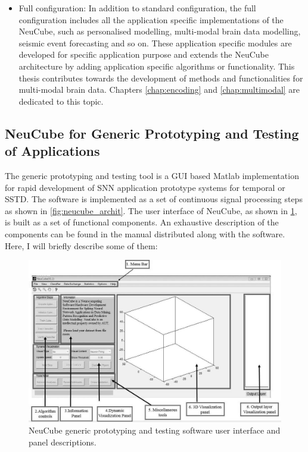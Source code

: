 \begin{itemize}
\begin{figure}
	\end{figure} 
	\item Full configuration: In addition to standard configuration, the full configuration includes all the application specific implementations of the NeuCube, such as personalised modelling, multi-modal brain data modelling, seismic event forecasting and so on. These application specific modules are developed for specific application purpose and extends the NeuCube architecture by adding application specific algorithms or functionality. This thesis contributes towards the development of methods and functionalities for multi-modal brain data. Chapters \ref{chap:encoding} and \ref{chap:multimodal} are dedicated to this topic.  
\end{itemize}

\subsection{NeuCube for Generic Prototyping and Testing of Applications}
The generic prototyping and testing tool is a GUI based Matlab implementation for rapid development of SNN application prototype systems for temporal or SSTD. The software is implemented as a set of continuous signal processing steps as shown in \figurename \ref{fig:neucube_archit}. The user interface of NeuCube, as shown in \figurename \ref{fig:neucube_ui}, is built as a set of functional components. An exhaustive description of the components can be found in the manual distributed along with the software. Here, I will briefly describe some of them:
\begin{figure}
	\centering
	\includegraphics[width=\linewidth]{fig/neucube/ui.png}
	\caption{NeuCube generic prototyping and testing software user interface and panel descriptions.}
	\label{fig:neucube_ui}
\end{figure}

